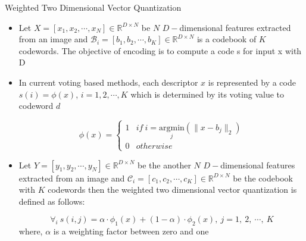 \documentclass [9pt,times] {beamer}
\begin{document}
\begin{frame}{Weighted Two Dimensional Vector Quantization}
\begin{itemize}
\item Let $X=[x_1, x_2, \cdots, x_N] \in \mathbb{R}^{D \times N}$ be $N$ $D-$dimensional features extracted from an image and $\mathcal{B}_i= [b_1, b_2, \cdots, b_K] \in \mathbb{R}^{D \times N}$ is a codebook of $K$ codewords.  The objective of encoding is to compute a code s for input x with D


\item In current voting based methods, each descriptor $x$ is represented by a code $s(i)=\phi(x)$, $ i=1, 2, \cdots, K$ which is determined by its voting value to codeword $d$ 


\begin{equation*}
\phi(x)= \begin{cases}1 & if \ i = \underset{j}{\mathrm{argmin}} (\parallel x-b_j\parallel_2)\\0 & otherwise\end{cases}
\end{equation*}
 

\item Let $Y=[y_1, y_2, \cdots, y_N] \in \mathbb{R}^{D \times N}$ be the another $N$ $D-$dimensional features extracted from an image and  $\mathcal{C}_i= [c_1, c_2, \cdots, c_K] \in \mathbb{R}^{D \times N}$ be  the codebook with $K$ codewords then the weighted two dimensional vector quantization  is defined as follows:

\begin{equation*}
\forall_i\ s(i, j)=\alpha \cdot \phi_1(x) + (1- \alpha) \cdot \phi_2(x),\ j=1,\ 2,\ \cdots,\ K
\end{equation*}
 where, $\alpha$ is a weighting factor between zero and one
\end{itemize}
\end{frame}
\end{document}
